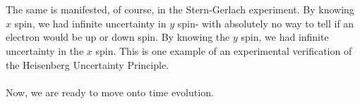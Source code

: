 \\\\
The same is manifested, of course, in the Stern-Gerlach experiment. By knowing $x$ spin, we had infinite uncertainty in $y$ spin- with absolutely no way to tell if an electron would be up or down spin. By knowing the $y$ spin, we had infinite uncertainty in the $x$ spin. This is one example of an experimental verification of the Heisenberg Uncertainty Principle.
\\\\
Now, we are ready to move onto time evolution.